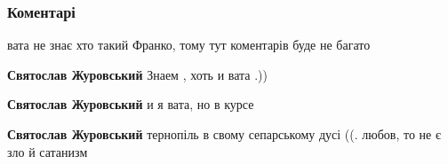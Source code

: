  
 
 
 
 
\subsubsection{Коментарі}

\begin{itemize}
 
вата не знає хто такий Франко, тому тут коментарів буде не багато \Smiley[1.0][yellow]

\begin{itemize}
 
\textbf{Святослав Журовський} Знаем , хоть и вата .))

 
\textbf{Святослав Журовський} и я вата, но в курсе

 
\textbf{Святослав Журовський} тернопіль в свому сепарському дусі ((. любов, то не є зло й сатанизм

 

\end{itemize}
\end{itemize}
